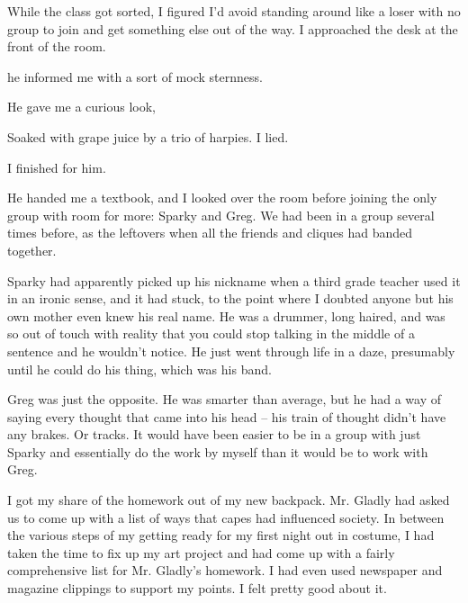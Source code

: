 While the class got sorted, I figured I'd avoid standing around like a loser with no group to join and get something else out of the way. I approached the desk at the front of the room.


 he informed me with a sort of mock sternness.


He gave me a curious look, 

Soaked with grape juice by a trio of harpies.  I lied.


 I finished for him.

He handed me a textbook, and I looked over the room before joining the only group with room for more: Sparky and Greg. We had been in a group several times before, as the leftovers when all the friends and cliques had banded together.

Sparky had apparently picked up his nickname when a third grade teacher used it in an ironic sense, and it had stuck, to the point where I doubted anyone but his own mother even knew his real name. He was a drummer, long haired, and was so out of touch with reality that you could stop talking in the middle of a sentence and he wouldn't notice. He just went through life in a daze, presumably until he could do his thing, which was his band.

Greg was just the opposite. He was smarter than average, but he had a way of saying every thought that came into his head -- his train of thought didn't have any brakes. Or tracks. It would have been easier to be in a group with just Sparky and essentially do the work by myself than it would be to work with Greg.

I got my share of the homework out of my new backpack. Mr. Gladly had asked us to come up with a list of ways that capes had influenced society. In between the various steps of my getting ready for my first night out in costume, I had taken the time to fix up my art project and had come up with a fairly comprehensive list for Mr. Gladly's homework. I had even used newspaper and magazine clippings to support my points. I felt pretty good about it.

